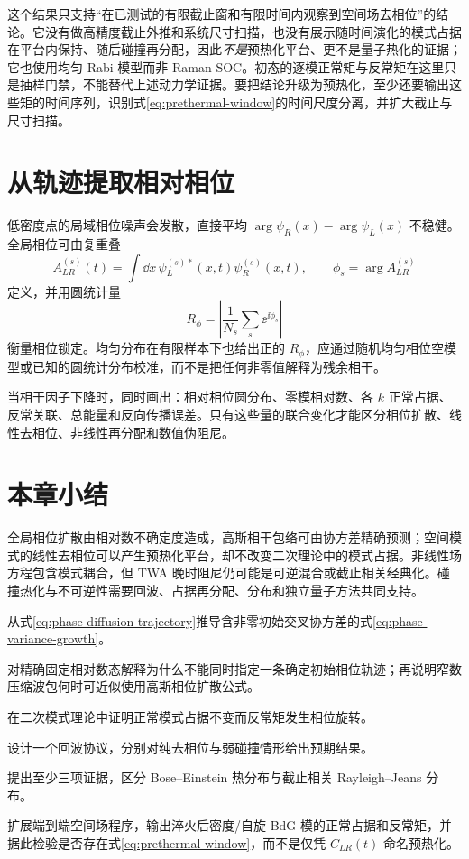 这个结果只支持“在已测试的有限截止窗和有限时间内观察到空间场去相位”的结论。它没有做高精度截止外推和系统尺寸扫描，也没有展示随时间演化的模式占据在平台内保持、随后碰撞再分配，因此\emph{不是}预热化平台、更不是量子热化的证据；它也使用均匀 Rabi 模型而非 Raman SOC。初态的逐模正常矩与反常矩在这里只是抽样门禁，不能替代上述动力学证据。要把结论升级为预热化，至少还要输出这些矩的时间序列，识别式\eqref{eq:prethermal-window}的时间尺度分离，并扩大截止与尺寸扫描。

\section{从轨迹提取相对相位}

低密度点的局域相位噪声会发散，直接平均
$\arg\psi_R(x)-\arg\psi_L(x)$ 不稳健。全局相位可由复重叠
\begin{equation}
  A_{LR}^{(s)}(t)=\int\dd x\,
  \psi_L^{(s)*}(x,t)\psi_R^{(s)}(x,t),
  \qquad
  \phi_s=\arg A_{LR}^{(s)}
  \label{eq:trajectory-relative-phase}
\end{equation}
定义，并用圆统计量
\begin{equation}
  R_\phi=\left|\frac1{N_s}\sum_s\ee^{\ii\phi_s}\right|
  \label{eq:circular-resultant}
\end{equation}
衡量相位锁定。均匀分布在有限样本下也给出正的 $R_\phi$，应通过随机均匀相位空模型或已知的圆统计分布校准，而不是把任何非零值解释为残余相干。

\begin{chaptercheck}
当相干因子下降时，同时画出：相对相位圆分布、零模相对数、各 $k$ 正常占据、反常关联、总能量和反向传播误差。只有这些量的联合变化才能区分相位扩散、线性去相位、非线性再分配和数值伪阻尼。
\end{chaptercheck}

\section*{本章小结}

全局相位扩散由相对数不确定度造成，高斯相干包络可由协方差精确预测；空间模式的线性去相位可以产生预热化平台，却不改变二次理论中的模式占据。非线性场方程包含模式耦合，但 TWA 晚时阻尼仍可能是可逆混合或截止相关经典化。碰撞热化与不可逆性需要回波、占据再分配、分布和独立量子方法共同支持。

\begin{exercises}
  \item 从式\eqref{eq:phase-diffusion-trajectory}推导含非零初始交叉协方差的式\eqref{eq:phase-variance-growth}。
  \item 对精确固定相对数态解释为什么不能同时指定一条确定初始相位轨迹；再说明窄数压缩波包何时可近似使用高斯相位扩散公式。
  \item 在二次模式理论中证明正常模式占据不变而反常矩发生相位旋转。
  \item 设计一个回波协议，分别对纯去相位与弱碰撞情形给出预期结果。
  \item 提出至少三项证据，区分 Bose--Einstein 热分布与截止相关 Rayleigh--Jeans 分布。
  \item 扩展端到端空间场程序，输出淬火后密度/自旋 BdG 模的正常占据和反常矩，并据此检验是否存在式\eqref{eq:prethermal-window}，而不是仅凭 $C_{LR}(t)$ 命名预热化。
\end{exercises}
